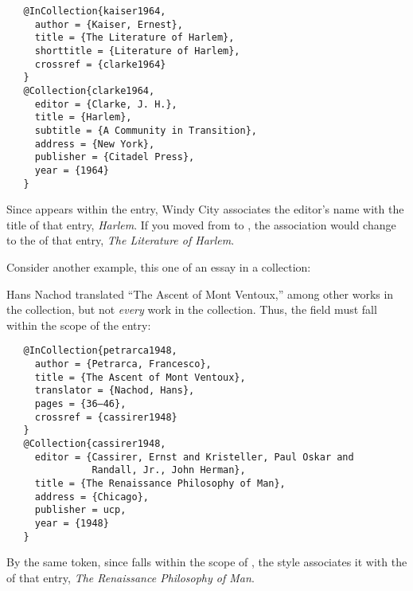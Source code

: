 \documentclass[11pt,letterpaper,oneside]{article}
\begin{document}
\begin{verbatim}
   @InCollection{kaiser1964,
     author = {Kaiser, Ernest},
     title = {The Literature of Harlem},
     shorttitle = {Literature of Harlem},
     crossref = {clarke1964}
   }
   @Collection{clarke1964,
     editor = {Clarke, J. H.},
     title = {Harlem},
     subtitle = {A Community in Transition},
     address = {New York},
     publisher = {Citadel Press},
     year = {1964}
   }
\end{verbatim}

\begin{citebib}
\item \cite{kaiser1964}
\end{citebib}

\noindent Since  appears within the
 entry, Windy City associates the editor's name
with the title of that entry, \textit{Harlem}. If you moved
 from  to ,
the association would change to the  of that entry,
\textit{The Literature of Harlem}.

Consider another example, this one of an essay in a collection:

\begin{citebib}
\item \cite{petrarca1948}
\end{citebib}

\noindent Hans Nachod translated ``The Ascent of Mont Ventoux,'' among
other works in the collection, but not \textit{every} work in the
collection. Thus, the  field must fall within the
scope of the  entry:

\begin{verbatim}
   @InCollection{petrarca1948,
     author = {Petrarca, Francesco},
     title = {The Ascent of Mont Ventoux},
     translator = {Nachod, Hans},
     pages = {36–46},
     crossref = {cassirer1948}
   }
   @Collection{cassirer1948,
     editor = {Cassirer, Ernst and Kristeller, Paul Oskar and
               Randall, Jr., John Herman},
     title = {The Renaissance Philosophy of Man},
     address = {Chicago},
     publisher = ucp,
     year = {1948}
   }
\end{verbatim}

\noindent By the same token, since  falls within the
scope of , the style associates it with the
 of that entry, \textit{The Renaissance Philosophy of
Man}.
\end{document}
